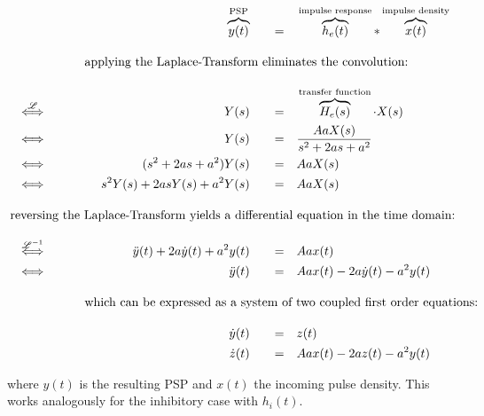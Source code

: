 \begin{alignat}{5}
    &                                           & &&          \overbrace{y(t)}^{\text{PSP}} \quad &&=& \quad \overbrace{h_e(t)}^{\text{impulse response}} \ast \overbrace{x(t)}^{\text{impulse density}} \label{eq:convolution} \\[1em]
    &                                           & \omit\rlap{applying the Laplace-Transform eliminates the convolution:}                 \nonumber \\[1em]
    &  \stackrel{\mathscr{L}}{\iff} \qquad      & &&                             Y(s) \quad &&=& \quad \overbrace{H_e(s)}^{\text{transfer function}} \cdot X(s)  \label{eq:laplace_domain} \\
    &  \iff                                     & &&                             Y(s) \quad &&=& \quad \frac{AaX(s)}{s^2+2as+a^2}  \nonumber \\
    &  \iff                                     & &&               (s^2+2as+a^2) Y(s) \quad &&=& \quad AaX(s) \nonumber \\
    &  \iff                                     & &&          s^{2}Y(s)+2asY(s)+a^{2}Y(s) \quad &&=& \quad AaX(s) \nonumber \\[1em]
    \omit\rlap{reversing the Laplace-Transform yields a differential equation in the time domain:}     \nonumber \\[1em]
    &  \stackrel{\mathscr{L}^{-1}}{\iff} \qquad & && \ddot{y}(t)+2a\dot{y}(t)+a^{2}y(t) \quad &&=& \quad Aax(t) \nonumber \\
    &  \iff                                     & &&                      \ddot{y}(t) \quad &&=& \quad Aax(t)-2a\dot{y}(t)-a^{2}y(t)  \label{eq:sec_ord_nmm} \\[1em]
    &                                           & \omit\rlap{which can be expressed as a system of two coupled first order equations:}                 \nonumber \\[1em]
    &                                           & &&                       \dot{y}(t) \quad &&=& \quad z(t)  \label{eq:y_t}\\
    &                                           & &&                       \dot{z}(t) \quad &&=& \quad Aax(t)-2az(t)-a^{2}y(t)   \label{eq:z_t}
\end{alignat}

where $y(t)$ is the resulting PSP and $x(t)$ the incoming pulse density.
This works analogously for the inhibitory case with $h_i(t)$.


